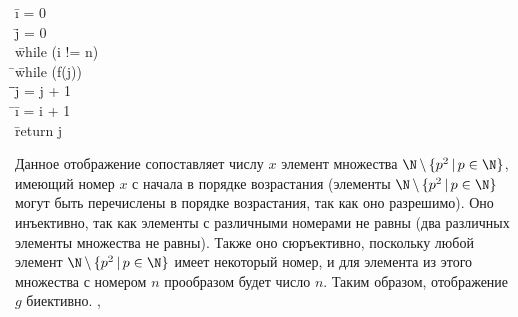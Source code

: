 \documentclass[a4paper,12pt]{article}
\newcommand{\tab}{\quad\=}
\newenvironment{programm}{
    \ttfamily
    \begin{tabbing}
    }
    {
    \end{tabbing}
}
\begin{document}
    \begin{programm}
    \tab i = 0\\
    \tab j = 0\\
    \tab while (i != n)\\
    \tab\tab while (f(j))\\
    \tab\tab\tab j = j + 1\\
    \tab\tab i = i + 1\\
    \tab return j
    \end{programm}
	
	Данное отображение сопоставляет числу $x$ элемент множества $\N\,\backslash\,\{p^2\,|\,p\in\N\}$, имеющий номер $x$ с начала в порядке возрастания (элементы $\N\,\backslash\,\{p^2\,|\,p\in\N\}$ могут быть перечислены в порядке возрастания, так как оно разрешимо). Оно инъективно, так как элементы с различными номерами не равны (два различных элементы множества не равны). Также оно сюръективно, поскольку любой элемент $\N\,\backslash\,\{p^2\,|\,p\in\N\}$ имеет некоторый номер, и для элемента из этого множества с номером $n$ прообразом будет число $n$. Таким образом, отображение $g$ биективно.
	\sep	
	
	\begin{comment}
	\section*{Задача 18}
    Постройте вычислимую биекцию между множествами $\N$ и $\N\,\backslash\,\{p^2\,|\,p\in\N\}$.
	\subsection*{Решение}
    Поскольку множество $\N\,\backslash\,\{p^2\,|\,p\in\N\}$ разрешимо, его элементы могут быть перечислены в порядке возрастания (для этого перечисляющему алгоритму нужно последовательно идти по натуральным числам, начиная с 0, и, если текущее число входит в $\N\,\backslash\,\{p^2\,|\,p\in\N\}$, выводить его). Следовательно, элементы $\N\,\backslash\,\{p^2\,|\,p\in\N\}$ могут быть пронумерованы натуральными числами. Тогда можно задать следующее отображение $f: \N\to\N\,\backslash\,\{p^2\,|\,p\in\N\}$: элементу $x\in\N$ сопоставляется элемент $\N\,\backslash\,\{p^2\,|\,p\in\N\}$ с номером $n$. Это отображение инъективно, так как элементы с различными номерами не равны (два различных элементы множества не равны). Также оно сюръективно, поскольку любой элемент $\N\,\backslash\,\{p^2\,|\,p\in\N\}$ имеет некоторый номер, и для элемента из этого множества с номером $n$ прообразом будет число $n$. Таким образом, отображение $g$ биективно.
    
	\sep
	
    \end{comment}
	
\end{document}

